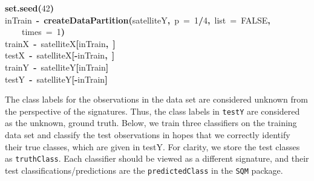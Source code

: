 \documentclass{article}
\makeatletter
\newcommand{\hlnumber}[1]{\textcolor[rgb]{0,0,0}{#1}}%
\newcommand{\hlfunctioncall}[1]{\textcolor[rgb]{.5,0,.33}{\textbf{#1}}}%
\newcommand{\hlkeyword}[1]{\textbf{#1}}%
\newcommand{\hlargument}[1]{\textcolor[rgb]{.69,.25,.02}{#1}}%
\newcommand{\hlassignement}[1]{\textbf{#1}}%
\newcommand{\hlsymbol}[1]{#1}%
\newcommand{\hlstd}[1]{\textcolor[rgb]{0,0,0}{#1}}%
\newenvironment{kframe}{%
 \def\FrameCommand##1{\hskip\@totalleftmargin \hskip-\fboxsep
 \colorbox{shadecolor}{##1}\hskip-\fboxsep
     \hskip-\linewidth \hskip-\@totalleftmargin \hskip\columnwidth}%
 \MakeFramed {\advance\hsize-\width
   \@totalleftmargin\z@ \linewidth\hsize
   \@setminipage}}%
 {\par\unskip\endMakeFramed}
\newenvironment{knitrout}{}{} %
\makeatother
\begin{document}
\begin{knitrout}
\color{fgcolor}\begin{kframe}
\begin{flushleft}
\ttfamily\noindent
\hlfunctioncall{set.seed}\hlkeyword{(}\hlnumber{42}\hlkeyword{)}\hspace*{\fill}\\
\hlstd{}\hlsymbol{inTrain}{\ }\hlassignement{\usebox{\hlnormalsizeboxlessthan}-}{\ }\hlfunctioncall{createDataPartition}\hlkeyword{(}\hlsymbol{satelliteY}\hlkeyword{,}{\ }\hlargument{p}{\ }\hlargument{=}{\ }\hlnumber{1}\hlkeyword{/}\hlnumber{4}\hlkeyword{,}{\ }\hlargument{list}{\ }\hlargument{=}{\ }\hlnumber{FALSE}\hlkeyword{,}\hspace*{\fill}\\
\hlstd{}{\ }{\ }{\ }{\ }\hlargument{times}{\ }\hlargument{=}{\ }\hlnumber{1}\hlkeyword{)}\hspace*{\fill}\\
\hlstd{}\hlsymbol{trainX}{\ }\hlassignement{\usebox{\hlnormalsizeboxlessthan}-}{\ }\hlsymbol{satelliteX}\hlkeyword{[}\hlsymbol{inTrain}\hlkeyword{,}{\ }\hlkeyword{]}\hspace*{\fill}\\
\hlstd{}\hlsymbol{testX}{\ }\hlassignement{\usebox{\hlnormalsizeboxlessthan}-}{\ }\hlsymbol{satelliteX}\hlkeyword{[}\hlkeyword{-}\hlsymbol{inTrain}\hlkeyword{,}{\ }\hlkeyword{]}\hspace*{\fill}\\
\hlstd{}\hlsymbol{trainY}{\ }\hlassignement{\usebox{\hlnormalsizeboxlessthan}-}{\ }\hlsymbol{satelliteY}\hlkeyword{[}\hlsymbol{inTrain}\hlkeyword{]}\hspace*{\fill}\\
\hlstd{}\hlsymbol{testY}{\ }\hlassignement{\usebox{\hlnormalsizeboxlessthan}-}{\ }\hlsymbol{satelliteY}\hlkeyword{[}\hlkeyword{-}\hlsymbol{inTrain}\hlkeyword{]}\mbox{}
\normalfont
\end{flushleft}
\end{kframe}
\end{knitrout}


The class labels for the observations in the data set are considered unknown from
the perspective of the signatures. Thus, the class labels in {\tt testY} are
considered as the unknown, ground truth. Below, we train three classifiers on the
training data set and classify the test observations in hopes that we correctly
identify their true classes, which are given in testY. For clarity, we store the
test classes as {\tt truthClass}. Each classifier should be viewed as a different
signature, and their test classifications/predictions are the {\tt predictedClass}
in the {\tt SQM} package.
\end{document}
